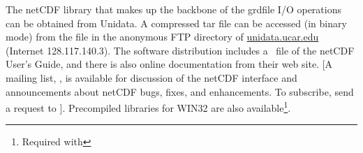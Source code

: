 The netCDF library that makes up the backbone of the grdfile
I/O operations can be obtained from  Unidata.  A compressed
tar file can be accessed (in binary mode) from the file
 in the anonymous FTP directory of
\underline{unidata.ucar.edu} (Internet 128.117.140.3).
The software distribution includes a \PS\ file of
the netCDF User's Guide, and there is also online documentation
from their web site.  [A mailing list,
,
is available for discussion of the netCDF interface and
announcements about netCDF bugs, fixes, and enhancements.  To
subscribe, send a request to
].
Precompiled libraries for WIN32 are also available\footnote{Required
with }.
